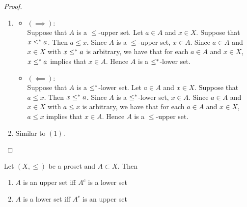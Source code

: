 \documentclass{book}
\begin{document}
	\begin{proof}\
		\begin{enumerate}
			\item 
			\begin{itemize}
				\item $(\implies)$: \\
				Suppose that $A$ is a $\leq$-upper set. Let $a \in A$ and $x \in X$. Suppose that $x \leq^* a$. Then $a \leq x$. Since $A$ is a $\leq$-upper set, $x \in A$. Since $a \in A$ and $x \in X$ with $x \leq^* a$ is arbitrary, we have that for each $a \in A$ and $x \in X$, $x \leq^* a$ implies that $x \in A$. Hence $A$ is a $\leq^*$-lower set. 
				\item $(\impliedby)$: \\
				Suppose that $A$ is a $\leq^*$-lower set. Let $a \in A$ and $x \in X$. Suppose that $a \leq x$. Then $x \leq^* a$. Since $A$ is a $\leq^*$-lower set, $x \in A$. Since $a \in A$ and $x \in X$ with $a \leq x$ is arbitrary, we have that for each $a \in A$ and $x \in X$, $a \leq x$ implies that $x \in A$. Hence $A$ is a $\leq$-upper set. 
			\end{itemize} 
			\item Similar to $(1)$. 
		\end{enumerate}
	\end{proof}
	
	\begin{ex} 
		Let $(X, \leq)$ be a proset and $A \subset X$. Then 
		\begin{enumerate}
			\item $A$ is an upper set iff $A^c$ is a lower set
			\item $A$ is a lower set iff $A^c$ is an upper set
		\end{enumerate}
	\end{ex}
	
\end{document}
